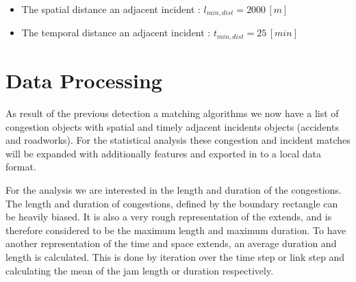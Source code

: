 \begin{itemize}
	\item The spatial distance an adjacent incident : $l_{min,dist} = 2000 \, [m]$
	\item The temporal distance an adjacent incident : $t_{min,dist} = 25 \, [min]$
\end{itemize}

\section{Data Processing}
\label{methodology_data_processing}
As result of the previous detection a matching algorithms we now have a list of congestion objects with spatial and timely adjacent incidents objects (accidents and roadworks). For the statistical analysis these congestion and incident matches will be expanded with additionally features and exported in to a local data format.

For the analysis we are interested in the length and duration of the congestions. The length and duration of congestions, defined by the boundary rectangle can be heavily biased. It is also a very rough representation of the extends, and is therefore considered to be the maximum length and maximum duration. To have another representation of the time and space extends, an average duration and length is calculated. This is done by iteration over the time step or link step and calculating the mean of the jam length or duration respectively.

